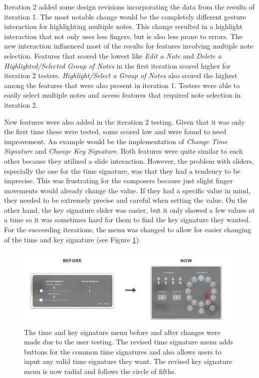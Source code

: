 			Iteration 2 added some design revisions incorporating the data from the results of iteration 1. The most notable change would be the completely different gesture interaction for highlighting multiple notes. This change resulted in a highlight interaction that not only uses less fingers, but is also less prone to errors. The new interaction influenced most of the results for features involving multiple note selection. Features that scored the lowest like \textit{Edit a Note} and \textit{Delete a Highlighted/Selected Group of Notes} in the first iteration scored higher for iteration 2 testers. \textit{Highlight/Select a Group of Notes} also scored the highest among the features that were also present in iteration 1. Testers were able to easily select multiple notes and access features that required note selection in iteration 2. 

			New features were also added in the iteration 2 testing. Given that it was only the first time these were tested, some scored low and were found to need improvement. An example would be the implementation of \textit{Change Time Signature} and \textit{Change Key Signature}. Both features were quite similar to each other because they utilized a slide interaction. However, the problem with sliders, especially the one for the time signature, was that they had a tendency to be imprecise. This was frustrating for the composers because just slight finger movements would already change the value. If they had a specific value in mind, they needed to be extremely precise and careful when setting the value. On the other hand, the key signature slider was easier, but it only showed a few values at a time so it was sometimes hard for them to find the key signature they wanted. For the succeeding iterations, the menu was changed to allow for easier changing of the time and key signature (see Figure \ref{fig:time-key-signature}).

			\begin{figure}[H]
				\centering
				\includegraphics[scale=0.25]{figures/before-after-timesigmenu}
			    \caption{The time and key signature menu before and after changes were made due to the user testing. The revised time signature menu adds buttons for the common time signatures and also allows users to input any valid time signature they want. The revised key signature menu is now radial and follows the circle of fifths.}
			    \label{fig:time-key-signature}
			\end{figure} 

